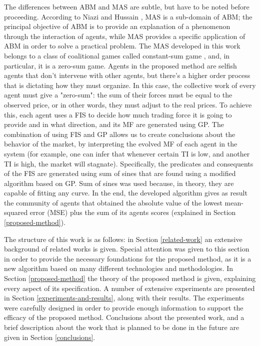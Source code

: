 \documentclass[a4paper,twoside]{article}
\begin{document}
The differences between ABM and MAS are subtle, but have to be noted before proceeding. According to Niazi and Hussain \cite{Niazi2011}, MAS is a sub-domain of ABM; the principal objective of ABM is to provide an explanation of a phenomenon through the interaction of agents, while MAS provides a specific application of ABM in order to solve a practical problem. The MAS developed in this work belongs to a class of coalitional games called constant-sum game \cite{Shoham2009}, and, in particular, it is a zero-sum game. Agents in the proposed method are selfish agents that don't intervene with other agents, but there's a higher order process that is dictating how they must organize. In this case, the collective work of every agent must give a "zero-sum": the sum of their forces must be equal to the observed price, or in other words, they must adjust to the real prices. To achieve this, each agent uses a FIS to decide how much trading force it is going to provide and in what direction, and its MF are generated using GP. The combination of using FIS and GP allows us to create conclusions about the behavior of the market, by interpreting the evolved MF of each agent in the system (for example, one can infer that whenever certain TI is low, and another TI is high, the market will stagnate). Specifically, the predicates and consequents of the FIS are generated using sum of sines that are found using a modified algorithm based on GP. Sum of sines was used because, in theory, they are capable of fitting any curve. In the end, the developed algorithm gives as result the community of agents that obtained the absolute value of the lowest mean-squared error (MSE) plus the sum of its agents scores (explained in Section \ref{proposed-method}).

The structure of this work is as follows: in Section \ref{related-work} an extensive background of related works is given. Special attention was given to this section in order to provide the necessary foundations for the proposed method, as it is a new algorithm based on many different technologies and methodologies. In Section \ref{proposed-method} the theory of the proposed method is given, explaining every aspect of its specification. A number of extensive experiments are presented in Section \ref{experiments-and-results}, along with their results. The experiments were carefully designed in order to provide enough information to support the efficacy of the proposed method. Conclusions about the presented work, and a brief description about the work that is planned to be done in the future are given in Section \ref{conclusions}.
  
\end{document}
